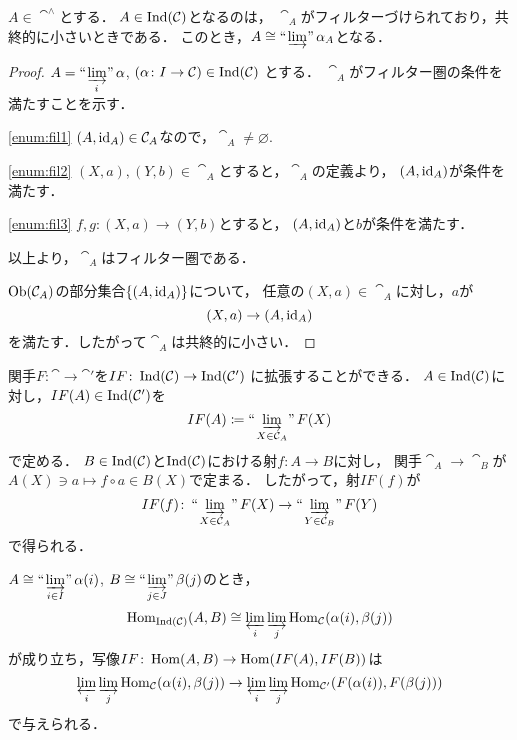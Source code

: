 \begin{Proposition}
    $A\in\cat^\wedge$とする．
    $A\in\mathop{\mathrm{Ind}}(\mathcal{C})$となるのは，
    $\cat_A$がフィルターづけられており，共終的に小さいときである．
    このとき，$A\cong\mathop{\text{``}\hspace{-0.7pt}\varinjlim\hspace{-1.5pt}\text{''}}\alpha_A$となる．
\end{Proposition}
\begin{proof}
    \(\displaystyle A=\mathop{\text{``}\hspace{-0.7pt}\varinjlim\hspace{-1.5pt}\text{''}}_i\alpha\), 
    \((\alpha\colon I\to \mathcal{C})\in\mathop{\mathrm{Ind}}(\mathcal{C})\) とする．
    \(\cat_A\)がフィルター圏の条件を満たすことを示す．

    \eqref{enum:fil1} 
    \((A,\mathop{\mathrm{id}}\nolimits_A)\in\mathcal{C}_A\)なので，\(\cat_A\ne\varnothing\). 
    
    \eqref{enum:fil2} 
    \((X,a),(Y,b)\in\cat_A\)とすると，\(\cat_A\)の定義より，
    \((A,\mathop{\mathrm{id}}\nolimits_A)\)が条件を満たす．

    \eqref{enum:fil3} 
    \(f,g\colon (X,a)\to(Y,b)\)とすると，
    \((A,\mathop{\mathrm{id}}\nolimits_A)\)と\(b\)が条件を満たす．

    以上より，\(\cat_A\)はフィルター圏である．

    \(\mathop{\textrm{Ob}}\nolimits(\mathcal{C}_A)\)の部分集合\(\left\{(A,\mathop{\mathrm{id}}\nolimits_A)\right\}\)について，
    任意の\((X,a)\in\cat_A\)に対し，\(a\)が
    \[
        (X,a)\to(A,\mathop{\mathrm{id}}\nolimits_A)
    \]
    を満たす．したがって\(\cat_A\)は共終的に小さい．
\end{proof}

関手$F\colon\cat\to\cat'$を$IF\colon\mathop{\mathrm{Ind}}(\mathcal{C})\to\mathop{\mathrm{Ind}}(\mathcal{C}')$
に拡張することができる．
$A\in\mathop{\mathrm{Ind}}(\mathcal{C})$に対し，$IF(A)\in\mathop{\mathrm{Ind}}(\mathcal{C}')$を
\begin{equation*}
    IF(A)\coloneqq\ind<\varinjlim_{X\in\cat_A}>F(X)
\end{equation*}
で定める．
$B\in\mathop{\mathrm{Ind}}(\mathcal{C})$と$\mathop{\mathrm{Ind}}(\mathcal{C})$における射$f\colon A\to B$に対し，
関手$\cat_A\to\cat_B$が$A(X)\ni a\mapsto f\circ a\in B(X)$で定まる．
したがって，射$IF(f)$が
\begin{equation*}
    IF(f)\colon
    \ind<\varinjlim_{X\in\cat_A}>F(X)
    \to
    \ind<\varinjlim_{Y\in\cat_B}>F(Y)
\end{equation*}
で得られる．

$A\cong\ind<\varinjlim_{i\in I}>\alpha(i)$, 
$B\cong\ind<\varinjlim_{j\in J}>\beta(j)$のとき，
\begin{equation*}
    \mathop{\mathrm{Hom}}\nolimits_{\mathop{\mathrm{Ind}}(\mathcal{C})}(A,B)
    \cong
    \varprojlim_i\varinjlim_j\mathop{\mathrm{Hom}}\nolimits_{\mathcal{C}}(\alpha(i),\beta(j))
\end{equation*}
が成り立ち，写像$IF\colon\mathop{\mathrm{Hom}}\nolimits(A,B)\to\mathop{\mathrm{Hom}}\nolimits(IF(A),IF(B))$は
\begin{equation*}
    \varprojlim_i\varinjlim_j\mathop{\mathrm{Hom}}\nolimits_{\mathcal{C}}(\alpha(i),\beta(j))
    \to
    \varprojlim_i\varinjlim_j\mathop{\mathrm{Hom}}\nolimits_{\mathcal{C}'}(F(\alpha(i)),F(\beta(j)))
\end{equation*}
で与えられる．


